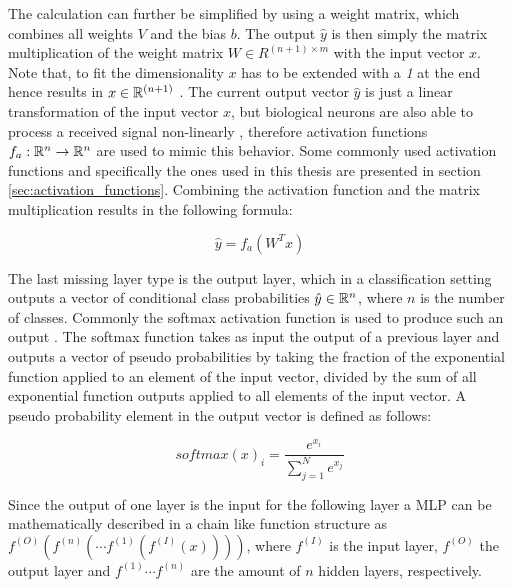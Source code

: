 The calculation can further be simplified by using a weight matrix, which combines all weights $V$ and the bias $b$.
The output $\hat{y}$ is then simply the matrix multiplication of the weight matrix $W \in R^{(n+1) \times m}$ with the input vector $x$.
Note that, to fit the dimensionality $x$ has to be extended with a \textit{1} at the end hence results in $x \in \mathbb{R}^{(n+1)}$ \cite{dl}.
The current output vector $\hat{y}$ is just a linear transformation of the input vector $x$, but biological neurons are also able to process a received signal non-linearly \cite{dl_mit}, therefore activation functions $f_{a}: \mathbb{R}^n \to \mathbb{R}^n$ are used to mimic this behavior.
Some commonly used activation functions and specifically the ones used in this thesis are presented in section \ref{sec:activation_functions}.
Combining the activation function and the matrix multiplication results in the following formula:

\begin{equation}
    \hat{y} = f_a(W^Tx)
    \label{eq:fc_weights}
\end{equation}

The last missing layer type is the output layer, which in a classification setting outputs a vector of conditional class probabilities $\hat{y} \in \mathbb{R}^n$, where $n$ is the number of classes.
Commonly the softmax activation function is used to produce such an output \cite{softmax}.
The softmax function takes as input the output of a previous layer and outputs a vector of pseudo probabilities by taking the fraction of the exponential function applied to an element of the input vector, divided by the sum of all exponential function outputs applied to all elements of the input vector.
A pseudo probability element in the output vector is defined as follows:

\begin{equation}
    softmax(x)_i = \frac{e^{x_i}}{\sum_{j=1}^Ne^{x_j}}
\end{equation}

Since the output of one layer is the input for the following layer a \ac{MLP} can be mathematically described in a chain like function structure as $f^{(O)}( f^{(n)} ( \cdots f^{(1)} (f^{(I)}(x))))$, where $f^{(I)}$ is the input layer, $f^{(O)}$ the output layer and $f^{(1)} \cdots f^{(n)}$ are the amount of $n$ hidden layers, respectively.




